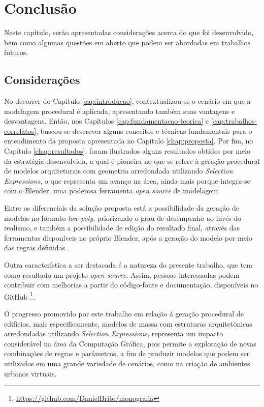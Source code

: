 \chapter{Conclusão}
\label{chap:conclusoes}

Neste capítulo, serão apresentadas considerações acerca do que foi desenvolvido, bem como algumas questões em aberto que podem ser abordadas em trabalhos futuros.

\section{Considerações}
\label{sec:consideracoes}

No decorrer do Capítulo \ref{cap:introducao}, contextualizou-se o cenário em que a modelagem procedural é aplicada, apresentando também suas vantagens e desvantagens. Então, nos Capítulos \ref{cap:fundamentacao-teorica} e \ref{cap:trabalhos-correlatos}, buscou-se descrever alguns conceitos e técnicas fundamentais para o entendimento da proposta apresentada no Capítulo \ref{chap:proposta}. Por fim, no Capítulo \ref{chap:resultados}, foram ilustrados alguns resultados obtidos por meio da estratégia desenvolvida, a qual é pioneira no que se refere à geração procedural de modelos arquiteturais com geometria arredondada utilizando \textit{Selection Expressions}, o que representa um avanço na área, ainda mais porque integra-se com o Blender, uma poderosa ferramenta \textit{open source} de modelagem.

Entre os diferenciais da solução proposta está a possibilidade da geração de modelos no formato \textit{low poly}, priorizando o grau de desempenho ao invés do realismo, e também a possibilidade de edição do resultado final, através das ferramentas disponíveis no próprio Blender, após a geração do modelo por meio das regras definidas.

Outra característica a ser destacada é a natureza do presente trabalho, que tem como resultado um projeto \textit{open source}. Assim, pessoas interessadas podem contribuir com melhorias a partir do código-fonte e documentação, disponíveis no GitHub \footnote{\href{https://github.com/DanielBrito/monografia}{https://github.com/DanielBrito/monografia}}.

O progresso promovido por este trabalho em relação à geração procedural de edifícios, mais especificamente, modelos de massa com estruturas arquitetônicas arredondadas utilizando \textit{Selection Expressions}, representa um impacto considerável na área da Computação Gráfica, pois permite a exploração de novas combinações de regras e parâmetros, a fim de produzir modelos que podem ser utilizados em uma grande variedade de cenários, como na criação de ambientes urbanos virtuais.

